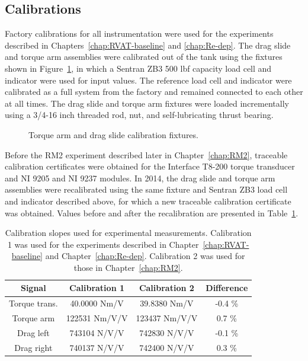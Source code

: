 \subsection{Calibrations}

Factory calibrations for all instrumentation were used for the experiments
described in Chapters~\ref{chap:RVAT-baseline} and \ref{chap:Re-dep}. The drag
slide and torque arm assemblies were calibrated out of the tank using the
fixtures shown in Figure~\ref{fig:calibration-fixtures}, in which a Sentran ZB3
500 lbf capacity load cell and indicator were used for input values. The
reference load cell and indicator were calibrated as a full system from the
factory and remained connected to each other at all times. The drag slide and
torque arm fixtures were loaded incrementally using a 3/4-16 inch threaded rod,
nut, and self-lubricating thrust bearing.

\begin{figure}
    \caption{Torque arm and drag slide calibration fixtures.}
    
    \label{fig:calibration-fixtures}
\end{figure}

Before the RM2 experiment described later in Chapter~\ref{chap:RM2}, traceable
calibration certificates were obtained for the Interface T8-200 torque
transducer and NI 9205 and NI 9237 modules. In 2014, the drag slide and torque
arm assemblies were recalibrated using the same fixture and Sentran ZB3 load
cell and indicator described above, for which a new traceable calibration
certificate was obtained. Values before and after the recalibration are
presented in Table~\ref{tab:calibrations}.

\begin{table}
    \centering
\begin{tabular}{c|c|c|c}
    Signal & Calibration 1 & Calibration 2 & Difference \\ 
    \hline 
    Torque trans. & 40.0000 Nm/V & 39.8380 Nm/V & -0.4 \% \\ 
    Torque arm & 122531 Nm/V/V & 123437 Nm/V/V & 0.7 \% \\ 
    Drag left & 743104 N/V/V & 742830 N/V/V & -0.1 \% \\ 
    Drag right & 740137 N/V/V & 742400 N/V/V & 0.3 \% \\ 
\end{tabular}
    \caption{Calibration slopes used for experimental measurements. Calibration
        1 was used for the experiments described in Chapter~\ref{chap:RVAT-baseline}
        and Chapter~\ref{chap:Re-dep}. Calibration 2 was used for those in
        Chapter~\ref{chap:RM2}.}
    
    \label{tab:calibrations}
\end{table}


